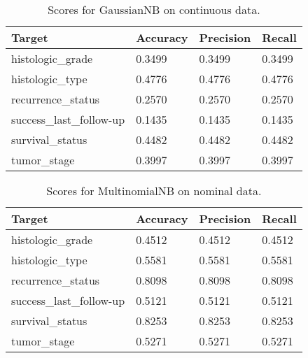 \documentclass{article}
\begin{document}
\begin{table}[H]
  \begin{center}
  \begin{tabular}{ *{4}{l} }
      \multicolumn{1}{p{1.5cm}}{\raggedright Target} &  
      \multicolumn{1}{p{1.5cm}}{\raggedright Accuracy} &  
      \multicolumn{1}{p{1.5cm}}{\raggedright Precision} &  
      \multicolumn{1}{p{1.5cm}}{\raggedright Recall} \\ \hline \hline
histologic\_grade         &       0.3499 &        0.3499 &     0.3499 \\ \hline
histologic\_type          &       0.4776 &        0.4776 &     0.4776 \\ \hline
recurrence\_status        &       0.2570 &        0.2570 &     0.2570 \\ \hline
success\_last\_follow-up  &       0.1435 &        0.1435 &     0.1435 \\ \hline
survival\_status          &       0.4482 &        0.4482 &     0.4482 \\ \hline
tumor\_stage              &       0.3997 &        0.3997 &     0.3997 \\ \hline
\end{tabular}
\caption{Scores for GaussianNB on continuous data.}
\end{center}
\end{table}

\begin{table}[H]
  \begin{center}
  \begin{tabular}{ *{4}{l} }
      \multicolumn{1}{p{1.5cm}}{\raggedright Target} &  
      \multicolumn{1}{p{1.5cm}}{\raggedright Accuracy} &  
      \multicolumn{1}{p{1.5cm}}{\raggedright Precision} &  
      \multicolumn{1}{p{1.5cm}}{\raggedright Recall} \\ \hline \hline
histologic\_grade        &       0.4512 &        0.4512 &     0.4512 \\ \hline
histologic\_type         &       0.5581 &        0.5581 &     0.5581 \\ \hline
recurrence\_status       &       0.8098 &        0.8098 &     0.8098 \\ \hline
success\_last\_follow-up &       0.5121 &        0.5121 &     0.5121 \\ \hline
survival\_status         &       0.8253 &        0.8253 &     0.8253 \\ \hline
tumor\_stage             &       0.5271 &        0.5271 &     0.5271 \\ \hline
\end{tabular}
\caption{Scores for MultinomialNB on nominal data.}
\end{center}
\end{table}
\end{document}
